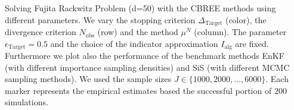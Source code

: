 Solving Fujita Rackwitz Problem (d=50) with the CBREE methods using      different parameters.     We vary the stopping criterion $\Delta_{\text{Target}}$ (color),     the divergence criterion $N_\text{obs}$ (row) and     the method $\mu^N$ (column).     The parameter $\epsilon_{\text{Target}} = 0.5$     and the choice of the indicator approximation $I_\text{alg}$     are fixed.     Furthermore we plot also the performance of the benchmark methods EnKF    (with different importance sampling densities)    and SiS (with different MCMC sampling methods).     We used the sample sizes $J \in \{1000, 2000, \ldots, 6000\}$.     Each marker represents the empirical estimates based the successful portion of $200$ simulations.